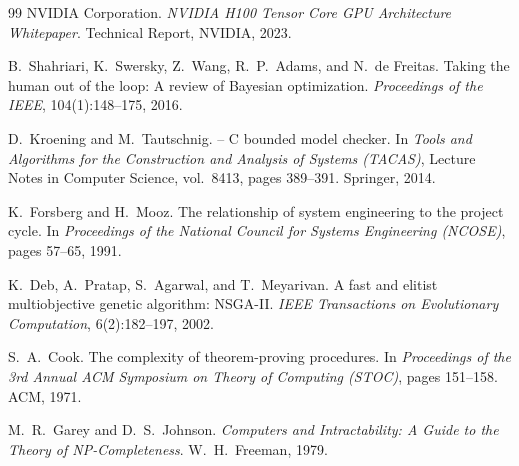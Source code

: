 ﻿\documentclass[a4paper,12pt]{article}
\theoremstyle{definition}
\begin{document}
\begin{thebibliography}{99}
NVIDIA Corporation.
\newblock \emph{NVIDIA H100 Tensor Core GPU Architecture Whitepaper}.
\newblock Technical Report, NVIDIA, 2023.

B.\ Shahriari, K.\ Swersky, Z.\ Wang, R.\ P.\ Adams, and N.\ de Freitas.
\newblock Taking the human out of the loop: A review of {Bayesian} optimization.
\newblock \emph{Proceedings of the IEEE}, 104(1):148--175, 2016.

D.\ Kroening and M.\ Tautschnig.
 -- {C} bounded model checker.
\newblock In \emph{Tools and Algorithms for the Construction and Analysis of
  Systems (TACAS)}, Lecture Notes in Computer Science, vol.\ 8413,
  pages 389--391. Springer, 2014.

K.\ Forsberg and H.\ Mooz.
\newblock The relationship of system engineering to the project cycle.
\newblock In \emph{Proceedings of the National Council for Systems Engineering
  (NCOSE)}, pages 57--65, 1991.

K.\ Deb, A.\ Pratap, S.\ Agarwal, and T.\ Meyarivan.
\newblock A fast and elitist multiobjective genetic algorithm: {NSGA-II}.
\newblock \emph{IEEE Transactions on Evolutionary Computation},
  6(2):182--197, 2002.

S.\ A.\ Cook.
\newblock The complexity of theorem-proving procedures.
\newblock In \emph{Proceedings of the 3rd Annual ACM Symposium on Theory of
  Computing (STOC)}, pages 151--158. ACM, 1971.

M.\ R.\ Garey and D.\ S.\ Johnson.
\newblock \emph{Computers and Intractability: A Guide to the Theory of
  NP-Completeness}.
\newblock W.\ H.\ Freeman, 1979.

\end{thebibliography}
\end{document}

